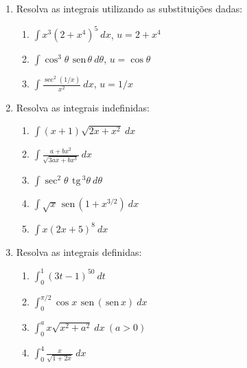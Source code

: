 \documentclass[a4paper,5pt]{amsbook}
\newcommand{\sen}{\,\mbox{sen}\,}
\newcommand{\tg}{\,\mbox{tg}\,}
\newcommand{\ds}{\displaystyle}
\begin{document}
\vspace{1cm}
\begin{enumerate}
	\vspace{0.5cm}
	\item Resolva as integrais utilizando as substituições dadas:
		\begin{enumerate}
			\item $\ds\int x^3{(2+x^4)}^5\ dx$, $u = 2+x^4$
			\item $\ds\int \cos^3\theta\ \sen\theta\ d\theta$, $u=\cos\theta$
			\item $\ds\int \frac{\sec^2(1/x)}{x^2}\ dx$, $u=1/x$
		\end{enumerate}

	\vspace{0.5cm}
	\item Resolva as integrais indefinidas:
		\begin{enumerate}
			\item $\ds\int (x+1)\sqrt{2x+x^2}\ dx$
			\item $\ds\int \frac{a+bx^2}{\sqrt{3ax+bx^3}}\ dx$
			\item $\ds\int \sec^2\theta\ \tg^3\theta\ d\theta$
			\item $\ds\int \sqrt{x}\ \sen{(1+x^{3/2})}\ dx$
			\item $\ds\int x{(2x+5)}^8\ dx$
		\end{enumerate}
	
	\vspace{0.5cm}
	\item Resolva as integrais definidas:
		\begin{enumerate}
			\item $\ds\int_0^1 {(3t-1)}^{50}\ dt$
			\item $\ds\int_0^{\pi/2} \cos{x}\ \sen{(\sen{x})}\ dx$
			\item $\ds\int_0^a x\sqrt{x^2+a^2}\ dx\ (a>0)$
			\item $\ds\int_0^4 \frac{x}{\sqrt{1+2x}}\ dx$
		\end{enumerate}

\end{enumerate}
\end{document}
